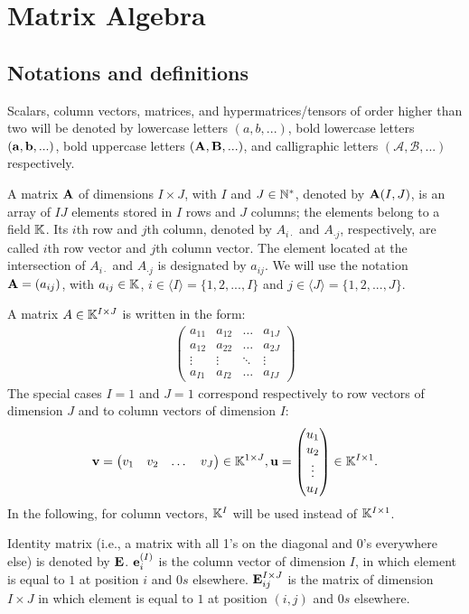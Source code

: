 \chapter{Matrix Algebra}

\section{Notations and definitions}

Scalars, column vectors, matrices, and hypermatrices/tensors of order higher than two will be 
denoted by lowercase letters $(a,b,...)$, 
bold lowercase letters $(\bold{a,b},...)$,
bold uppercase letters $(\bold{A},\bold{B},...)$,
and calligraphic letters $(\mathcal{A},\mathcal{B},...)$ respectively.

\par
A matrix $\bold{A}$ of dimensions $I\times J$, with $I$ and $J\in \mathbb{N}^*$,
denoted by $\bold{A}(I,J)$, is an array of $IJ$ elements stored in $I$ rows and 
$J$ columns; the elements belong to a field $\mathbb{K}$. Its $i$th row and
$j$th column, denoted by $A_{i\cdot}$ and $A_{\cdot j}$, respectively, are called $i$th row vector and
$j$th column vector. The element located at the intersection of $A_{i\cdot}$ and $A_{\cdot j}$ is 
designated by $a_{ij}$. We will use the notation $\bold{A}=(a_{ij})$, 
with $a_{ij}\in\mathbb{K}$, $i\in \langle {I} \rangle=\{1,2,...,I\}$ and 
$j\in \langle{J} \rangle=\{1,2,...,J\}$.
\par
A matrix $A\in\mathbb{K}^{I\times J}$ is written in the form:
\begin{align*}
    \begin{pmatrix}
        a_{11}& a_{12} & \dots & a_{1J} \\
        a_{12}& a_{22} & \dots & a_{2J} \\
        \vdots& \vdots  & \ddots & \vdots\\
        a_{I1}& a_{I2}  & \dots & a_{IJ}
      \end{pmatrix}
\end{align*} 
The special cases $I=1$ and $J=1$ correspond respectively to row vectors of dimension $J$ 
and to column vectors of dimension $I$:
\begin{align*}
    \bold{v}=\begin{pmatrix}
        v_1& v_{2} & \dots & v_{J} 
      \end{pmatrix}\in \mathbb{K}^{1\times J},
    \bold{u}=\begin{pmatrix}
        u_1\\ u_{2} \\ \vdots \\ u_{I} 
      \end{pmatrix}\in \mathbb{K}^{I\times 1}.
\end{align*}
In the following, for column vectors, $\mathbb{K}^{I}$ will be used instead of $\mathbb{K}^{I\times 1}$.
\par
Identity matrix (i.e., a matrix with all 1's on the diagonal
and 0's everywhere else) is denoted by $\bold{E}$.
$\bold{e}_{i}^{(I)}$ is the column vector of dimension $I$,
in which element is equal to $1$ at position $i$ and $0s$ elsewhere.
$\bold{E}_{ij}^{I\times J}$ is the matrix of dimension $I\times J$
in which element is equal to $1$ at position $(i,j)$ and $0s$ elsewhere.

